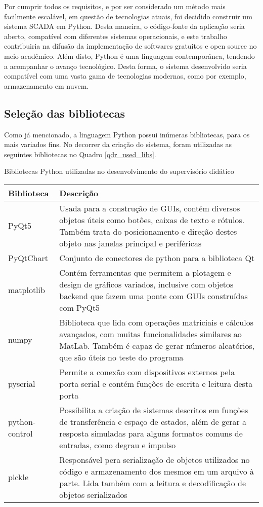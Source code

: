 Por cumprir todos os requisitos, e por ser considerado um método mais facilmente escalável, em questão de tecnologias atuais, foi decidido construir um sistema SCADA em Python. Desta maneira, o código-fonte da aplicação seria aberto, compatível com diferentes sistemas operacionais, e este trabalho contribuiria na difusão da implementação de softwares gratuitos e open source no meio acadêmico. Além disto, Python é uma linguagem contemporânea, tendendo a acompanhar o avanço tecnológico. Desta forma, o sistema desenvolvido seria compatível com uma vasta gama de tecnologias modernas, como por exemplo, armazenamento em nuvem.

\subsection{Seleção das bibliotecas}

Como já mencionado, a linguagem Python possui inúmeras bibliotecas, para os mais variados fins. No decorrer da criação do sistema, foram utilizadas as seguintes bibliotecas no Quadro \ref{qdr_used_libs}.

\begin{quadro}
	\centering
	\caption{Bibliotecas Python utilizadas no desenvolvimento do supervisório didático}
	\begin{tabular}{|m{5em}|m{25em}|}
		\hline
		Biblioteca & Descrição \\
		\hline
		PyQt5 & Usada para a construção de GUIs, contém diversos objetos úteis como botões, caixas de texto e rótulos. Também trata do posicionamento e direção destes objeto nas janelas principal e periféricas \cite{pyqtdoc} \\
		\hline
		PyQtChart & Conjunto de conectores de python para a biblioteca Qt \\
		\hline
		matplotlib & Contém ferramentas que permitem a plotagem e design de gráficos variados, inclusive com objetos backend que fazem uma ponte com GUIs construídas com PyQt5 \cite{hunter2007matplotlib} \\
		\hline
		numpy & Biblioteca que lida com operações matriciais e cálculos avançados, com muitas funcionalidades similares ao MatLab. Também é capaz de gerar números aleatórios, que são úteis no teste do programa \cite{harris2020array} \\
		\hline
		pyserial & Permite a conexão com dispositivos externos pela porta serial e contém funções de escrita e leitura desta porta \cite{pyserial} \\
		\hline
		python-control & Possibilita a criação de sistemas descritos em funções de transferência e espaço de estados, além de gerar a resposta simuladas para alguns formatos comuns de entradas, como degrau e impulso \cite{pythoncontrol} \\
		\hline
		pickle & Responsável pera serialização de objetos utilizados no código e armazenamento dos mesmos em um arquivo à parte. Lida também com a leitura e decodificação de objetos serializados \\
		\hline
	\end{tabular}
	\label{qdr_used_libs}
\end{quadro}

